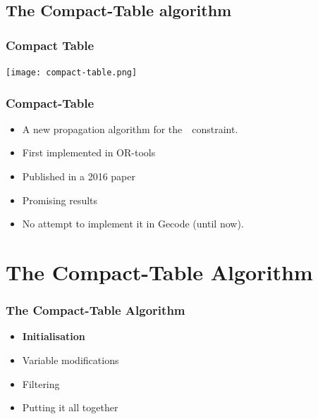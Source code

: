 \documentclass{beamer}
\newcommand{\Table}{\Constraint{Table}}
\newcommand{\CTpaper}[0]{DBLP:conf/cp/DemeulenaereHLP16}
\begin{document}
\subsection{The Compact-Table algorithm}

\begin{frame}
  \frametitle{Compact Table}
  \texttt{[image: compact-table.png]}
\end{frame}

\begin{frame}
  \frametitle{Compact-Table}
  \begin{itemize}
  \item   A new propagation algorithm for the~\Table~constraint.
  \item   First implemented in OR-tools
  \item   Published in a 2016 paper%
  \item   Promising results
  \item   No attempt to implement it in Gecode (until now).
  \end{itemize}

\end{frame}

\section{The Compact-Table Algorithm}

\begin{frame}
  \frametitle{The Compact-Table Algorithm}
  \begin{itemize}
  \item \textbf{Initialisation}
  \item \color{gray}Variable modifications
  \item Filtering
   \item {\color{gray}Putting it all together}
  \end{itemize}

\end{frame}
\end{document}
